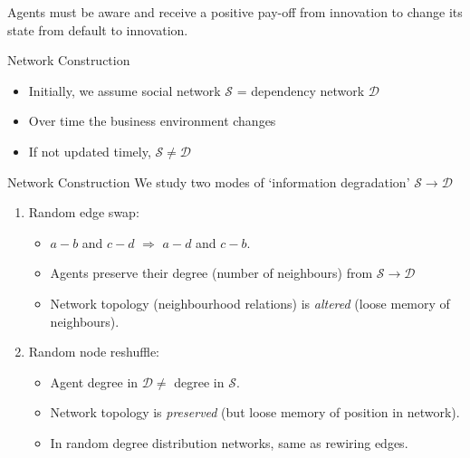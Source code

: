 \documentclass[10pt, xcolor=dvipsnames]{beamer}
\begin{document}
\begin{frame}[standout]
Agents must be aware and receive a positive pay-off from innovation to change its state from default to innovation.
\end{frame}

\begin{frame}{Network Construction}
\begin{itemize}
\pause \item Initially, we assume social network $\mathcal{S}$ = dependency network $\mathcal{D}$
\pause \item Over time the business environment changes
\pause \item If not updated timely, $\mathcal{S}\neq \mathcal{D}$
\end{itemize}
\end{frame}
\begin{frame}{Network Construction}
\pause We study two modes of `information degradation' $\mathcal{S}\to \mathcal{D}$ \cite{brummitt_multiplexity-facilitated_2012}
\begin{enumerate}
\pause \item Random edge swap:
  \begin{itemize}
  \pause \item $a-b$ and $c- d$ $\Rightarrow$ $a -d$ and $c- b$.
  \pause \item Agents preserve their degree (number of neighbours) from $\mathcal{S} \to \mathcal{D}$
  \pause \item Network topology (neighbourhood relations) is \emph{altered} (loose memory of neighbours).
  \end{itemize}
\pause \item Random node reshuffle:
\begin{itemize}
\pause \item Agent degree in $\mathcal{D} \neq$ degree in $\mathcal{S}$.
\pause \item Network topology is \emph{preserved} (but loose memory of position in network).
\pause \item In random degree distribution networks, same as rewiring edges.
\end{itemize}
\end{enumerate}
\end{frame}
\end{document}
